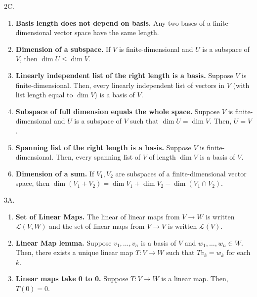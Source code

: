 \documentclass[12pt]{article}
\theoremstyle{definition}
\theoremstyle{named}
\begin{document}
2C. 
\begin{enumerate}
	\item \textbf{Basis length does not depend on basis. } Any two bases of a finite-dimensional vector space have the same length. 
	\item \textbf{Dimension of a subspace. } If $V$ is finite-dimensional and $U$ is a subspace of $V$, then $\dim U \leq \dim V$. 
	\item \textbf{Linearly independent list of the right length is a basis. } Suppose $V$ is finite-dimensional. Then, every linearly independent list of vectors in $V$ (with list length equal to $\dim V$) is a basis of $V$. 
	\item \textbf{Subspace of full dimension equals the whole space. } Suppose $V$ is finite-dimensional and $U$ is a subspace of $V$ such that $\dim U = \dim V$. Then, $U = V$. 
	\item \textbf{Spanning list of the right length is a basis. } Suppose $V$ is finite-dimensional. Then, every spanning list of $V$ of length $\dim V$ is a basis of $V$. 
	\item \textbf{Dimension of a sum. } If $V_1,V_2$ are subspaces of a finite-dimensional vector space, then $\dim (V_1+V_2) = \dim V_1 + \dim V_2 - \dim (V_1 \cap V_2)$. 
\end{enumerate}

3A. 
\begin{enumerate}
	\item \textbf{Set of Linear Maps. } The linear of linear maps from $V \to W$ is written $\mathscr{L}(V,W)$ and the set of linear maps from $V \to V$ is written $\mathscr{L}(V)$. 
	\item \textbf{Linear Map lemma. } Suppose $v_1,\dots,v_n$ is a basis of $V$ and $w_1,\dots,w_n \in W$. Then, there exists a unique linear map $T: V \to W$ such that $Tv_k = w_k$ for each $k$. 
	\item \textbf{Linear maps take 0 to 0. } Suppose $T: V \to W$ is a linear map. Then, $T(0)=0$. 
\end{enumerate}
\end{document}
